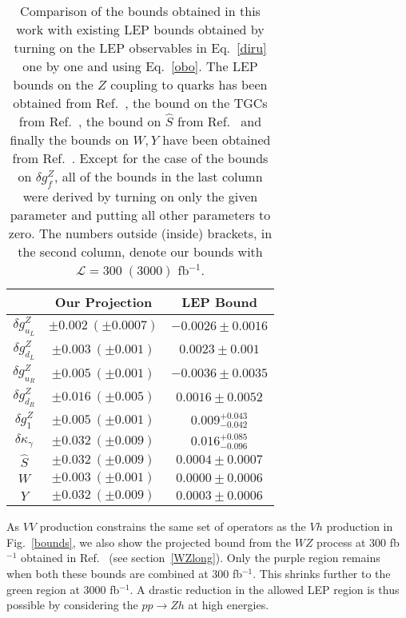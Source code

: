 \begin{table}[t]
\begin{center}

\begin{tabular}{c|c|c}%
&Our Projection &LEP Bound\\\hline
$\delta g^Z_{u_L}$         & $\pm0.002~(\pm0.0007)$ & $-0.0026\pm 0.0016$\\
$\delta g^Z_{d_L}$         & $\pm0.003~(\pm0.001)$  & $0.0023\pm 0.001$\\
$\delta g^Z_{u_R}$         & $\pm0.005~(\pm0.001)$  & $-0.0036\pm 0.0035$\\
$\delta g^Z_{d_R}$         & $\pm0.016~(\pm0.005)$  & $0.0016\pm 0.0052$\\
$\delta g^Z_1$             & $\pm0.005~(\pm0.001)$  & $0.009^{+0.043}_{-0.042}$\\
$\delta \kappa_\gamma$     & $\pm0.032~(\pm0.009)$  & $0.016^{+0.085}_{-0.096}$\\
$\hat{S}$                  & $\pm0.032~(\pm0.009)$ & $0.0004 \pm 0.0007$\\
$W$                        & $\pm0.003~(\pm0.001)$  & $0.0000 \pm 0.0006$\\
$Y$                        & $\pm0.032~(\pm0.009)$  & $0.0003\pm 0.0006$
 \end{tabular}
  \caption{Comparison of the bounds obtained in this work with existing LEP bounds obtained by turning on the LEP observables in Eq.~\ref{diru} one by one and using Eq.~\ref{obo}. The LEP bounds on the $Z$ coupling to quarks has been obtained from Ref.~\cite{Falkowski:2014tna}, the bound on the TGCs from Ref.~\cite{LEP2}, the bound on $\hat{S}$ from Ref.~\cite{Baak:2012kk} and  finally the bounds on $W,Y$ have been obtained from Ref.~\cite{Barbieri:2004qk}. Except for the case of the bounds on $\delta g^Z_f$, all of the bounds in the last column were derived by turning on only the given parameter and putting all other parameters  to zero. The numbers outside (inside) brackets, 
  in the second column, denote our bounds with $\mathcal{L} = 300 \; (3000)$ fb$^{-1}$.  \label{lepb}}
\end{center}
\end{table}

As $VV$ production constrains the same set of operators as the $Vh$ 
production in Fig.~\ref{bounds}, we also show the projected bound from the $WZ$ process at 300 
fb$^{-1}$ obtained in Ref.~\cite{Franceschini:2017xkh} (see section~\ref{WZlong}). Only the 
purple region remains when both these bounds are combined  at 300 fb$^{-1}$. This shrinks further to the green region  at 3000 fb$^{-1}$. A drastic reduction in the allowed LEP region is   thus possible by considering the $pp \to Zh$ at high energies.

